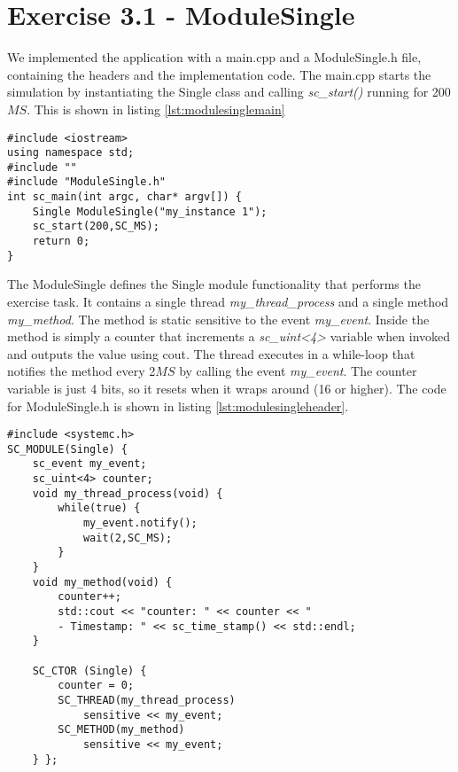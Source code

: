 \section{Exercise 3.1 - ModuleSingle}

We implemented the application with a main.cpp and a ModuleSingle.h file, containing the headers and the implementation code. The main.cpp starts the simulation by instantiating the Single class and calling \textit{sc\_start()} running for 200$MS$. This is shown in listing \ref{lst:modulesinglemain}

\begin{lstlisting}[style=customc++, caption=Application file for ModuleSingle,
label={lst:modulesinglemain}]
#include <iostream>
using namespace std;
#include ""
#include "ModuleSingle.h"
int sc_main(int argc, char* argv[]) {
	Single ModuleSingle("my_instance 1");
	sc_start(200,SC_MS);
	return 0;
}
\end{lstlisting}

\noindent The ModuleSingle defines the Single module functionality that performs the exercise task. It contains a single thread \textit{my\_thread\_process} and a single method \textit{my\_method}. The method is static sensitive to the event \textit{my\_event}. Inside the method is simply a counter that increments a \textit{sc\_uint<4>} variable when invoked and outputs the value using cout. The thread executes in a while-loop that notifies the method every 2$MS$ by calling the event \textit{my\_event}. The counter variable is just 4 bits, so it resets when it wraps around (16 or higher). The code for ModuleSingle.h is shown in listing \ref{lst:modulesingleheader}.

\begin{lstlisting}[style=customc++, caption=Implementation of ModuleSingle,
label={lst:modulesingleheader}]
#include <systemc.h>
SC_MODULE(Single) {
	sc_event my_event;
	sc_uint<4> counter;
	void my_thread_process(void) {
		while(true) {
			my_event.notify();
			wait(2,SC_MS);
		}
	}
	void my_method(void) {
		counter++;
		std::cout << "counter: " << counter << "
		- Timestamp: " << sc_time_stamp() << std::endl;
	}
	
	SC_CTOR (Single) {
		counter = 0;
		SC_THREAD(my_thread_process)
			sensitive << my_event;
		SC_METHOD(my_method)
			sensitive << my_event;
	} };
\end{lstlisting}
